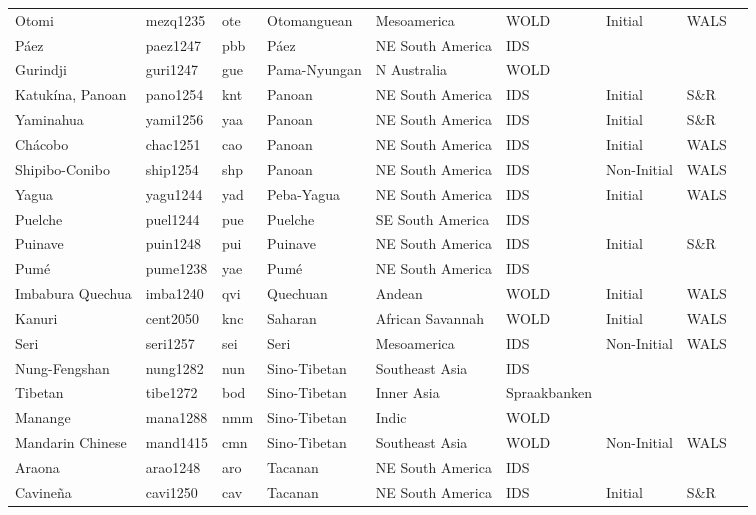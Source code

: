 \begin{longtable}{lllllllll}
  Otomi & mezq1235 & ote & Otomanguean & Mesoamerica & WOLD & Initial & WALS &  \\ 
  Páez & paez1247 & pbb & Páez & NE South America & IDS &  &  &  \\ 
  Gurindji & guri1247 & gue & Pama-Nyungan & N Australia & WOLD &  &  &  \\ 
  Katukína, Panoan & pano1254 & knt & Panoan & NE South America & IDS & Initial & S\&R & \cite[38]{aguiar_katukina1988}\cite[231]{aguiar_katukina1994_o.pdf} \\ 
  Yaminahua & yami1256 & yaa & Panoan & NE South America & IDS & Initial & S\&R & \cite[32..]{FaustLoosGramaticaYaminahua.pdf} \\ 
  Chácobo & chac1251 & cao & Panoan & NE South America & IDS & Initial & WALS &  \\ 
  Shipibo-Conibo & ship1254 & shp & Panoan & NE South America & IDS & Non-Initial & WALS &  \\ 
  Yagua & yagu1244 & yad & Peba-Yagua & NE South America & IDS & Initial & WALS &  \\ 
  Puelche & puel1244 & pue & Puelche & SE South America & IDS &  &  &  \\ 
  Puinave & puin1248 & pui & Puinave & NE South America & IDS & Initial & S\&R & \cite[209]{higuita_puinave2008_s.pdf} \\ 
  Pumé & pume1238 & yae & Pumé & NE South America & IDS &  &  &  \\ 
  Imbabura Quechua & imba1240 & qvi & Quechuan & Andean & WOLD & Initial & WALS &  \\ 
  Kanuri & cent2050 & knc & Saharan & African Savannah & WOLD & Initial & WALS &  \\ 
  Seri & seri1257 & sei & Seri & Mesoamerica & IDS & Non-Initial & WALS &  \\ 
  Nung-Fengshan & nung1282 & nun & Sino-Tibetan & Southeast Asia & IDS &  &  &  \\ 
  Tibetan & tibe1272 & bod & Sino-Tibetan & Inner Asia & Spraakbanken &  &  &  \\ 
  Manange & mana1288 & nmm & Sino-Tibetan & Indic & WOLD &  &  &  \\ 
  Mandarin Chinese & mand1415 & cmn & Sino-Tibetan & Southeast Asia & WOLD & Non-Initial & WALS &  \\ 
  Araona & arao1248 & aro & Tacanan & NE South America & IDS &  &  &  \\ 
  Cavineña & cavi1250 & cav & Tacanan & NE South America & IDS & Initial & S\&R & \cite[102]{guillaume_cavinena2008v3}\cite[599]{15_Pronouns.pdf} \\ 

\end{longtable}
